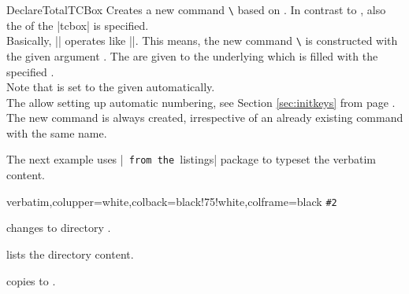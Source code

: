 \begin{docCommand}{DeclareTotalTCBox}{}
  Creates a new command \texttt{\textbackslash} based on .
  In contrast to , also the  of the |tcbox| is specified.\\
  Basically, |\DeclareTotalTCBox| operates like |\DeclareDocumentCommand|. This means,
  the new command \texttt{\textbackslash} is constructed with the given argument .
  The  are given to the underlying  which is filled with
  the specified .\\
  Note that  is set to the given 
  automatically.\\
  The  allow setting up automatic numbering,
  see Section \ref{sec:initkeys} from page \pageref{sec:initkeys}.\\
  The new command is always created, irrespective of an already existing
  command with the same name.


The next example uses |\lstinline| from the |listings| package to
typeset the verbatim content.

\begin{dispExample}
{verbatim,colupper=white,colback=black!75!white,colframe=black}
{%
  \lstinline[language=command.com,keywordstyle=\color{blue!35!white}\bfseries]^#2^}

 changes to directory .

 lists the directory content.

 copies  to
  .
\end{dispExample}
\end{docCommand}

